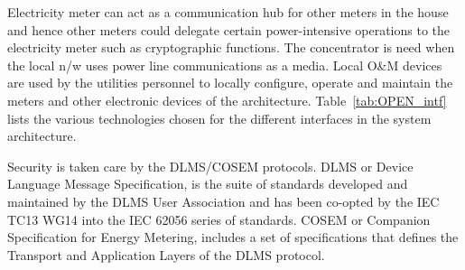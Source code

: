 Electricity meter can act as a communication hub for other meters in the house and hence other meters could delegate certain power-intensive operations to the electricity meter such as cryptographic functions. The concentrator is need when the local n/w uses power line communications as a media. Local O\&M devices are used by the utilities personnel to locally configure, operate and maintain the meters and other electronic devices of the architecture. Table~\ref{tab:OPEN_intf} lists the various technologies chosen for the different interfaces in the system architecture.

Security is taken care by the DLMS/COSEM protocols. DLMS or Device Language Message Specification, is the suite of standards developed and maintained by the DLMS User Association and has been co-opted by the IEC TC13 WG14 into the IEC 62056 series of standards. COSEM or Companion Specification for Energy Metering, includes a set of specifications that defines the Transport and Application Layers of the DLMS protocol. 